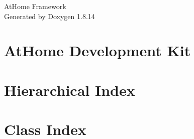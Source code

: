 \documentclass[twoside]{book}
\newcommand{\+}{\discretionary{\mbox{\scriptsize$\hookleftarrow$}}{}{}}
\newcommand{\clearemptydoublepage}{%
  \newpage{\pagestyle{empty}\cleardoublepage}%
}
\begin{document}
\hypersetup{pageanchor=false,
             bookmarksnumbered=true,
             pdfencoding=unicode
            }
\begin{titlepage}
\vspace*{7cm}
\begin{center}%
{\Large At\+Home Framework }\\
\vspace*{1cm}
{\large Generated by Doxygen 1.8.14}\\
\end{center}
\end{titlepage}
\clearemptydoublepage
{}
\tableofcontents
\clearemptydoublepage
{}
\hypersetup{pageanchor=true}

\chapter{At\+Home Development Kit}
\label{index}\hypertarget{index}{}
\chapter{Hierarchical Index}

\chapter{Class Index}

\end{document}
